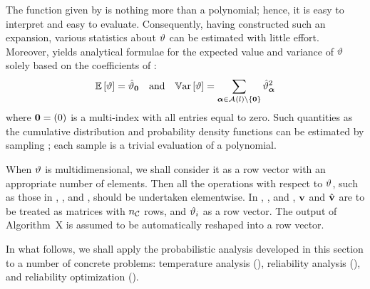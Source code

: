 The function given by  is nothing more than a polynomial; hence, it is easy to interpret and easy to evaluate.
Consequently, having constructed such an expansion, various statistics about $\vartheta$ can be estimated with little effort.
Moreover,  yields analytical formulae for the expected value and variance of $\vartheta$ solely based on the coefficients of :
\begin{equation} \elab{probabilistic-moments}
  \expectation{\w} = \coefficient{\w}_\vZero \hspace{1em} \text{and} \hspace{1em} \variance{\w} = \sum_{\multiindex \in \multiindexSet{\level} \setminus \{ \vZero \}} \coefficient{\w}_{\multiindex}^2
\end{equation}
where $\mathbf{0} = (0)$ is a multi-index with all entries equal to zero.
Such quantities as the cumulative distribution and probability density functions can be estimated by sampling ; each sample is a trivial evaluation of a polynomial.

\begin{remark} 
When $\vartheta$ is multidimensional, we shall consider it as a row vector with an appropriate number of elements.
Then all the operations with respect to $\vartheta$, such as those in , , and , should be undertaken elementwise.
In , , and , $\mathbf{v}$ and $\hat{\mathbf{v}}$ are to be treated as matrices with ${n_\mathcal{C}}$ rows, and $\vartheta_i$ as a row vector.
The output of Algorithm~X is assumed to be automatically reshaped into a row vector.
\end{remark}

In what follows, we shall apply the probabilistic analysis developed in this section to a number of concrete problems: temperature analysis (), reliability analysis (), and reliability optimization ().
